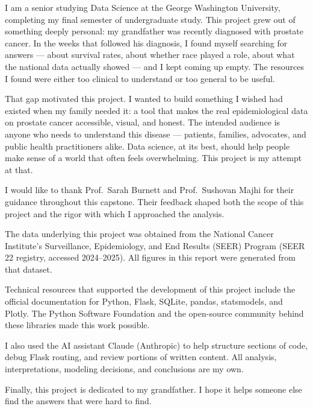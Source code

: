 
\begin{preface}
I am a senior studying Data Science at the George Washington University, completing
my final semester of undergraduate study. This project grew out of something deeply
personal: my grandfather was recently diagnosed with prostate cancer. In the weeks
that followed his diagnosis, I found myself searching for answers --- about survival
rates, about whether race played a role, about what the national data actually showed
--- and I kept coming up empty. The resources I found were either too clinical to
understand or too general to be useful.

That gap motivated this project. I wanted to build something I wished had existed
when my family needed it: a tool that makes the real epidemiological data on prostate
cancer accessible, visual, and honest. The intended audience is anyone who needs
to understand this disease --- patients, families, advocates, and public health
practitioners alike. Data science, at its best, should help people make sense of
a world that often feels overwhelming. This project is my attempt at that.
\end{preface}

\vspace{1cm}

\begin{acknowledgements}
I would like to thank Prof.\ Sarah Burnett and Prof.\ Sushovan Majhi for their
guidance throughout this capstone. Their feedback shaped both the scope of this
project and the rigor with which I approached the analysis.

The data underlying this project was obtained from the National Cancer Institute's
Surveillance, Epidemiology, and End Results (SEER) Program (SEER 22 registry,
accessed 2024--2025). All figures in this report were generated from that dataset.

Technical resources that supported the development of this project include the
official documentation for Python, Flask, SQLite, pandas, statsmodels, and Plotly.
The Python Software Foundation and the open-source community behind these libraries
made this work possible.

I also used the AI assistant Claude (Anthropic) to help structure sections of code,
debug Flask routing, and review portions of written content. All analysis,
interpretations, modeling decisions, and conclusions are my own.

Finally, this project is dedicated to my grandfather. I hope it helps someone else
find the answers that were hard to find.
\end{acknowledgements}

